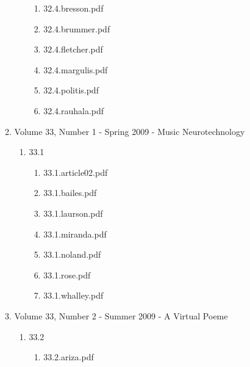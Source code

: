 \documentclass[11pt]{article}
\begin{document}
\begin{enumerate}
\begin{enumerate}
\begin{enumerate}
\begin{enumerate}
\item 32.4.bresson.pdf
\label{sec-1-1-1-1-11-19-19-13-1-2}

\item 32.4.brummer.pdf
\label{sec-1-1-1-1-11-19-19-13-1-3}

\item 32.4.fletcher.pdf
\label{sec-1-1-1-1-11-19-19-13-1-4}

\item 32.4.margulis.pdf
\label{sec-1-1-1-1-11-19-19-13-1-5}

\item 32.4.politis.pdf
\label{sec-1-1-1-1-11-19-19-13-1-6}

\item 32.4.rauhala.pdf
\label{sec-1-1-1-1-11-19-19-13-1-7}
\end{enumerate}
\end{enumerate}

\item Volume 33, Number 1 - Spring 2009 - Music Neurotechnology
\label{sec-1-1-1-1-11-19-19-14}
\begin{enumerate}
\item 33.1
\label{sec-1-1-1-1-11-19-19-14-1}
\begin{enumerate}
\item 33.1.article02.pdf
\label{sec-1-1-1-1-11-19-19-14-1-1}

\item 33.1.bailes.pdf
\label{sec-1-1-1-1-11-19-19-14-1-2}

\item 33.1.laurson.pdf
\label{sec-1-1-1-1-11-19-19-14-1-3}

\item 33.1.miranda.pdf
\label{sec-1-1-1-1-11-19-19-14-1-4}

\item 33.1.noland.pdf
\label{sec-1-1-1-1-11-19-19-14-1-5}

\item 33.1.rose.pdf
\label{sec-1-1-1-1-11-19-19-14-1-6}

\item 33.1.whalley.pdf
\label{sec-1-1-1-1-11-19-19-14-1-7}
\end{enumerate}
\end{enumerate}

\item Volume 33, Number 2 - Summer 2009 - A Virtual Poeme
\label{sec-1-1-1-1-11-19-19-15}
\begin{enumerate}
\item 33.2
\label{sec-1-1-1-1-11-19-19-15-1}
\begin{enumerate}
\item 33.2.ariza.pdf
\label{sec-1-1-1-1-11-19-19-15-1-1}


\end{enumerate}
\end{enumerate}
\end{enumerate}
\end{enumerate}
\end{document}

